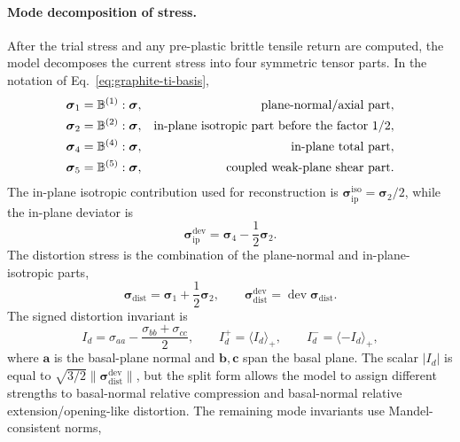 \paragraph{Mode decomposition of stress.}
After the trial stress and any pre-plastic brittle tensile return are computed, the model decomposes the current stress into four symmetric tensor parts.  In the notation of Eq.~\eqref{eq:graphite-ti-basis},
\begin{align}
  \boldsymbol{\sigma}_1 &= \mathbb B^{(1)}:\boldsymbol{\sigma},
  &\hbox{plane-normal/axial part},\\
  \boldsymbol{\sigma}_2 &= \mathbb B^{(2)}:\boldsymbol{\sigma},
  &\hbox{in-plane isotropic part before the factor }1/2,\\
  \boldsymbol{\sigma}_4 &= \mathbb B^{(4)}:\boldsymbol{\sigma},
  &\hbox{in-plane total part},\\
  \boldsymbol{\sigma}_5 &= \mathbb B^{(5)}:\boldsymbol{\sigma},
  &\hbox{coupled weak-plane shear part}.
  \label{eq:graphite-stress-parts}
\end{align}
The in-plane isotropic contribution used for reconstruction is \(\boldsymbol{\sigma}_{\mathrm{ip}}^{\mathrm{iso}}=\boldsymbol{\sigma}_2/2\), while the in-plane deviator is
\begin{equation}
  \boldsymbol{\sigma}_{\mathrm{ip}}^{\mathrm{dev}} = \boldsymbol{\sigma}_4 - \frac{1}{2}\boldsymbol{\sigma}_2 .
  \label{eq:graphite-inplane-dev}
\end{equation}
The distortion stress is the combination of the plane-normal and in-plane-isotropic parts,
\begin{equation}
  \boldsymbol{\sigma}_{\mathrm{dist}} = \boldsymbol{\sigma}_1 + \frac{1}{2}\boldsymbol{\sigma}_2,
  \qquad
  \boldsymbol{\sigma}_{\mathrm{dist}}^{\mathrm{dev}} =
  \operatorname{dev}\boldsymbol{\sigma}_{\mathrm{dist}}.
  \label{eq:graphite-distortion-stress}
\end{equation}
The signed distortion invariant is
\begin{equation}
  I_d = \sigma_{aa} - \frac{\sigma_{bb}+\sigma_{cc}}{2},
  \qquad
  I_d^+ = \langle I_d\rangle_+,
  \qquad
  I_d^- = \langle -I_d\rangle_+,
  \label{eq:graphite-signed-distortion}
\end{equation}
where \(\mathbf a\) is the basal-plane normal and \(\mathbf b,\mathbf c\) span the basal plane.  The scalar \(|I_d|\) is equal to \(\sqrt{3/2}\|\boldsymbol{\sigma}_{\mathrm{dist}}^{\mathrm{dev}}\|\), but the split form allows the model to assign different strengths to basal-normal relative compression and basal-normal relative extension/opening-like distortion.  The remaining mode invariants use Mandel-consistent norms,
